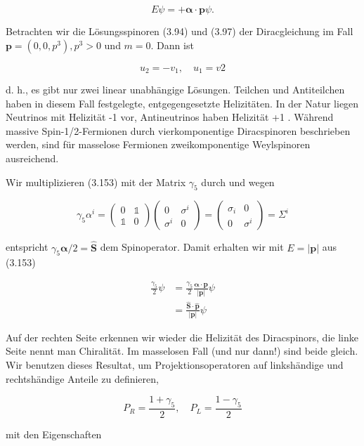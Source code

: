 \documentclass[10pt, letterpaper]{article}
\begin{document}
$$
E \psi=+\boldsymbol{\alpha} \cdot \mathbf{p} \psi .
$$

Betrachten wir die Lösungsspinoren (3.94) und (3.97) der Diracgleichung im Fall $\mathbf{p}=\left(0,0, p^{3}\right), p^{3}>0$ und $m=0$. Dann ist

$$
u_{2}=-v_{1}, \quad u_{1}=v 2
$$

d. h., es gibt nur zwei linear unabhängige Lösungen. Teilchen und Antiteilchen haben in diesem Fall festgelegte, entgegengesetzte Helizitäten. In der Natur liegen Neutrinos mit Helizität -1 vor, Antineutrinos haben Helizität +1 . Während massive Spin-1/2-Fermionen durch vierkomponentige Diracspinoren beschrieben werden, sind für masselose Fermionen zweikomponentige Weylspinoren ausreichend.

Wir multiplizieren (3.153) mit der Matrix $\gamma_{5}$ durch und wegen

$$
\gamma_{5} \alpha^{i}=\left(\begin{array}{ll}
0 & \mathbb{1} \\
\mathbb{1} & 0
\end{array}\right)\left(\begin{array}{cc}
0 & \sigma^{i} \\
\sigma^{i} & 0
\end{array}\right)=\left(\begin{array}{cc}
\sigma_{i} & 0 \\
0 & \sigma^{i}
\end{array}\right)=\Sigma^{i}
$$

entspricht $\gamma_{5} \boldsymbol{\alpha} / 2=\hat{\mathbf{S}}$ dem Spinoperator. Damit erhalten wir mit $E=|\mathbf{p}|$ aus (3.153)

$$
\begin{aligned}
\frac{\gamma_{5}}{2} \psi & =\frac{\gamma_{5}}{2} \frac{\boldsymbol{\alpha} \cdot \mathbf{p}}{|\mathbf{p}|} \psi \\
& =\frac{\hat{\mathbf{S}} \cdot \hat{\mathbf{p}}}{|\mathbf{p}|} \psi
\end{aligned}
$$

Auf der rechten Seite erkennen wir wieder die Helizität des Diracspinors, die linke Seite nennt man Chiralität. Im masselosen Fall (und nur dann!) sind beide gleich. Wir benutzen dieses Resultat, um Projektionsoperatoren auf linkshändige und rechtshändige Anteile zu definieren,

$$
P_{R}=\frac{1+\gamma_{5}}{2}, \quad P_{L}=\frac{1-\gamma_{5}}{2}
$$

mit den Eigenschaften
\end{document}
